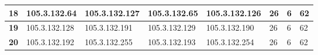 \begin{table}[H]
\begin{tabular}{@{}|l|l|l|l|l|l|l|l|@{}}
\textbf{18}              & 105.3.132.64                           & 105.3.132.127                                                                       & 105.3.132.65                                                                        & 105.3.132.126                                                                      & 26                                                           & 6                                                              & 62                                                             \\ \midrule
\textbf{19}              & 105.3.132.128                          & 105.3.132.191                                                                       & 105.3.132.129                                                                       & 105.3.132.190                                                                      & 26                                                           & 6                                                              & 62                                                             \\ \midrule
\textbf{20}              & 105.3.132.192                          & 105.3.132.255                                                                       & 105.3.132.193                                                                       & 105.3.132.254                                                                      & 26                                                           & 6                                                              & 62                                                             \\ \bottomrule
\end{tabular}
\end{table}